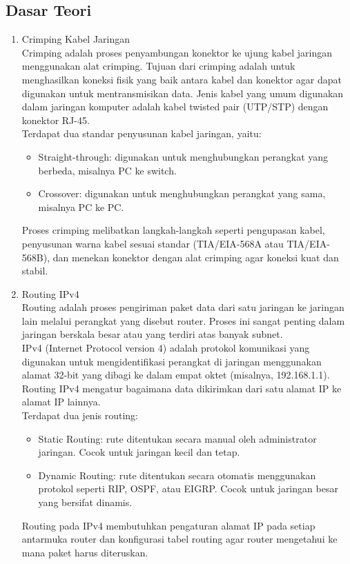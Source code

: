 \subsection{Dasar Teori}
\begin{enumerate}
    \item Crimping Kabel Jaringan
    \\Crimping adalah proses penyambungan konektor ke ujung kabel jaringan menggunakan alat crimping. Tujuan dari crimping adalah untuk menghasilkan koneksi fisik yang baik antara kabel dan konektor agar dapat digunakan untuk mentransmisikan data. Jenis kabel yang umum digunakan dalam jaringan komputer adalah kabel twisted pair (UTP/STP) dengan konektor RJ-45.
    \\Terdapat dua standar penyusunan kabel jaringan, yaitu:
    \begin{itemize}
        \item Straight-through: digunakan untuk menghubungkan perangkat yang berbeda, misalnya PC ke switch.
        \item Crossover: digunakan untuk menghubungkan perangkat yang sama, misalnya PC ke PC.
    \end{itemize}
    Proses crimping melibatkan langkah-langkah seperti pengupasan kabel, penyusunan warna kabel sesuai standar (TIA/EIA-568A atau TIA/EIA-568B), dan menekan konektor dengan alat crimping agar koneksi kuat dan stabil.
    \item Routing IPv4
    \\Routing adalah proses pengiriman paket data dari satu jaringan ke jaringan lain melalui perangkat yang disebut router. Proses ini sangat penting dalam jaringan berskala besar atau yang terdiri atas banyak subnet.
    \\IPv4 (Internet Protocol version 4) adalah protokol komunikasi yang digunakan untuk mengidentifikasi perangkat di jaringan menggunakan alamat 32-bit yang dibagi ke dalam empat oktet (misalnya, 192.168.1.1). Routing IPv4 mengatur bagaimana data dikirimkan dari satu alamat IP ke alamat IP lainnya.
    \\Terdapat dua jenis routing:
    \begin{itemize}
        \item Static Routing: rute ditentukan secara manual oleh administrator jaringan. Cocok untuk jaringan kecil dan tetap.
        \item Dynamic Routing: rute ditentukan secara otomatis menggunakan protokol seperti RIP, OSPF, atau EIGRP. Cocok untuk jaringan besar yang bersifat dinamis.
    \end{itemize}
    Routing pada IPv4 membutuhkan pengaturan alamat IP pada setiap antarmuka router dan konfigurasi tabel routing agar router mengetahui ke mana paket harus diteruskan.
\end{enumerate}



